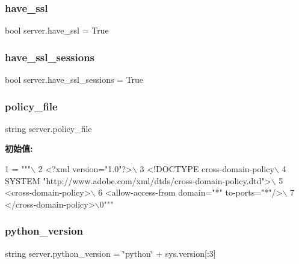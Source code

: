 \mbox{\label{namespaceserver_ac00fdf40a0746b38ef2edcfbc30e8ab4}} 
\subsubsection{\texorpdfstring{have\+\_\+ssl}{have\_ssl}}
{\footnotesize\ttfamily bool server.\+have\+\_\+ssl = True}

\mbox{\label{namespaceserver_a1a00a033df4f0f501c08a48b0fe3576e}} 
\subsubsection{\texorpdfstring{have\+\_\+ssl\+\_\+sessions}{have\_ssl\_sessions}}
{\footnotesize\ttfamily bool server.\+have\+\_\+ssl\+\_\+sessions = True}

\mbox{\label{namespaceserver_a6bc5d1b1f25bf1fde3266fa15447a414}} 
\subsubsection{\texorpdfstring{policy\+\_\+file}{policy\_file}}
{\footnotesize\ttfamily string server.\+policy\+\_\+file}

{\bfseries 初始值\+:}
\begin{DoxyCode}
1 =  \textcolor{stringliteral}{"""\(\backslash\)}
2 \textcolor{stringliteral}{<?xml version="1.0"?>\(\backslash\)}
3 \textcolor{stringliteral}{<!DOCTYPE cross-domain-policy\(\backslash\)}
4 \textcolor{stringliteral}{ SYSTEM "http://www.adobe.com/xml/dtds/cross-domain-policy.dtd">\(\backslash\)}
5 \textcolor{stringliteral}{<cross-domain-policy>\(\backslash\)}
6 \textcolor{stringliteral}{<allow-access-from domain="*" to-ports="*"/>\(\backslash\)}
7 \textcolor{stringliteral}{</cross-domain-policy>\(\backslash\)0"""}
\end{DoxyCode}
\mbox{\label{namespaceserver_a2d9eb5bc772371a5bf0eab11f69c96e0}} 
\subsubsection{\texorpdfstring{python\+\_\+version}{python\_version}}
{\footnotesize\ttfamily string server.\+python\+\_\+version = \char`\"{}python\char`\"{} + sys.\+version\mbox{[}\+:3\mbox{]}}

